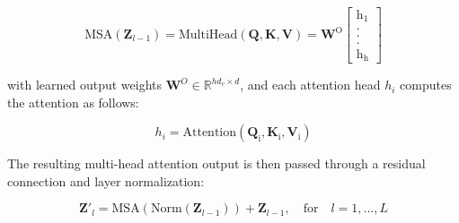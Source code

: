 \begin{equation}
\label{multihead_eq}
\mathrm{MSA}(\mathbf{Z}_{l-1}) = \mathrm{MultiHead\mathbf{(Q,K,V)} = 
\mathbf{W}^O \begin{bmatrix}
 h_1\\
.\\
.\\
.\\
 h_h
\end{bmatrix}
}
\end{equation}

with learned output weights $\mathbf{W}^O \in \mathbb{R} ^{hd_v\times d} $, and each attention head $h_i$ computes the attention as follows:

\begin{equation}
    h_i = \mathrm{Attention({\mathbf{Q}}_i, {\mathbf{K}}_i,{\mathbf{V}}_i) }
\end{equation}

The resulting multi-head attention output is then passed through a residual connection and layer normalization:

\begin{equation}
\mathbf{Z'}_{l} = \mathrm{MSA}({\mathrm{Norm}(\mathbf{Z}_{l-1})}) + {\mathbf{Z}_{l-1}}, \quad \mathrm{for} \quad l=1,..., L
\end{equation}

